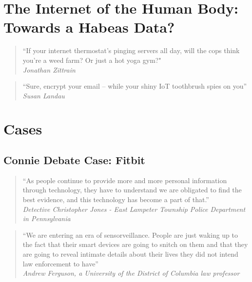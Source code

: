 \section{The Internet of the Human Body: Towards a Habeas Data?}
\begin{multicols}{2}
    \begin{quote}
        “If your internet thermostat's pinging servers all day, will the cops think you're a weed farm? Or just a hot yoga gym?" \\ \textit{Jonathan Zittrain}
    \end{quote}

    \begin{quote}
        “Sure, encrypt your email – while your shiny IoT toothbrush spies on you” \\ \textit{Susan Landau}
    \end{quote}
\end{multicols}

\newpage

\section{Cases}

\subsection{Connie Debate Case: Fitbit}

\begin{multicols}{2}
    \begin{quote}
        “As people continue to provide more and more personal information through technology, they have to understand we are obligated to find the best evidence, and this technology has become a part of that.”  \\
        \textit{Detective Christopher Jones - East Lampeter Township Police Department in Pennsylvania}
    \end{quote}

    \begin{quote}
        “We are entering an era of sensorveillance. People are just waking up to the fact that their smart devices are going to snitch on them and that they are going to reveal intimate details about their lives they did not intend law enforcement to have”  \\
        \textit{Andrew Ferguson, a University of the District of Columbia law professor}
    \end{quote}
\end{multicols}

